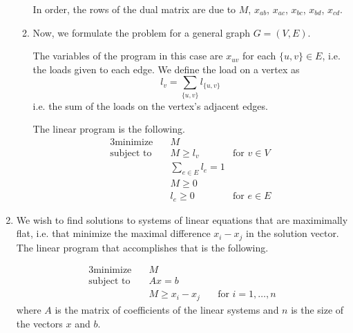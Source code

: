 \documentclass[letterpaper,11pt]{article}
\begin{document}
\begin{enumerate}
\begin{enumerate}
                In order, the rows of the dual matrix are due to $M$, $x_{ab}$,
                $x_{ac}$, $x_{bc}$, $x_{bd}$, $x_{cd}$.

            \item Now, we formulate the problem for a general graph
                $G = (V, E)$.

                The variables of the program in this case are $x_{uv}$
                for each $\{u, v\} \in E$, i.e. the loads given to each edge.
                We define the load on a vertex as
                $$
                l_v = \sum_{\{u, v\}} {l_{\{u, v\}}}
                $$
                i.e. the sum of the loads on the vertex's adjacent edges.

                The linear program is the following.
                \begin{alignat*}{3}
                    \text{minimize} \quad
                        & M \\
                    \text{subject to} \quad
                        & M \geq l_v & \text{for } v \in V \\
                        & \sum_{e \in E} l_e = 1 \\
                        & M \geq 0 \\
                        & l_e \geq 0 & \text{for } e \in E
                \end{alignat*}
        \end{enumerate}

    \item We wish to find solutions to systems of linear equations that are
        maximimally flat, i.e. that minimize the maximal difference $x_i - x_j$
        in the solution vector. The linear program that accomplishes that is
        the following.

        \begin{alignat*}{3}
            \text{minimize} \quad
                & M \\
            \text{subject to} \quad
                & A x = b \\
                & M \geq x_i - x_j \quad
                & \text{for } i = 1, \dots, n
        \end{alignat*}
        where $A$ is the matrix of coefficients of the linear systems and $n$
        is the size of the vectors $x$ and $b$.

\end{enumerate}
\end{document}
